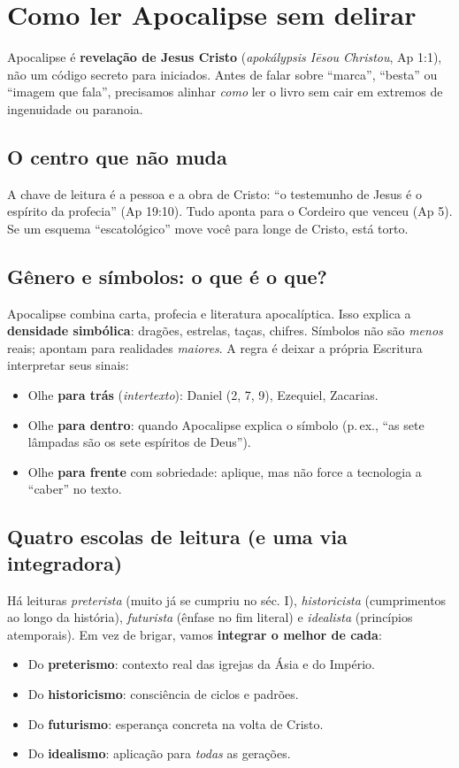 \chapter{Como ler Apocalipse sem delirar}
Apocalipse é \textbf{revelação de Jesus Cristo} (\emph{apokálypsis Iēsou Christou}, Ap 1:1), não um código secreto para iniciados. Antes de falar sobre “marca”, “besta” ou “imagem que fala”, precisamos alinhar \textit{como} ler o livro sem cair em extremos de ingenuidade ou paranoia.

\section{O centro que não muda}
A chave de leitura é a pessoa e a obra de Cristo: “o testemunho de Jesus é o espírito da profecia” (Ap 19:10). Tudo aponta para o Cordeiro que venceu (Ap 5). Se um esquema “escatológico” move você para longe de Cristo, está torto.

\section{Gênero e símbolos: o que é o que?}
Apocalipse combina carta, profecia e literatura apocalíptica. Isso explica a \textbf{densidade simbólica}: dragões, estrelas, taças, chifres. Símbolos não são \emph{menos} reais; apontam para realidades \emph{maiores}. A regra é deixar a própria Escritura interpretar seus sinais:
\begin{itemize}[leftmargin=*,noitemsep]
  \item Olhe \textbf{para trás} (\textit{intertexto}): Daniel (2, 7, 9), Ezequiel, Zacarias.
  \item Olhe \textbf{para dentro}: quando Apocalipse explica o símbolo (p.\,ex., “as sete lâmpadas são os sete espíritos de Deus”). 
  \item Olhe \textbf{para frente} com sobriedade: aplique, mas não force a tecnologia a “caber” no texto.
\end{itemize}

\section{Quatro escolas de leitura (e uma via integradora)}
Há leituras \textit{preterista} (muito já se cumpriu no séc. I), \textit{historicista} (cumprimentos ao longo da história), \textit{futurista} (ênfase no fim literal) e \textit{idealista} (princípios atemporais). Em vez de brigar, vamos \textbf{integrar o melhor de cada}:
\begin{itemize}[leftmargin=*,noitemsep]
  \item Do \textbf{preterismo}: contexto real das igrejas da Ásia e do Império.
  \item Do \textbf{historicismo}: consciência de ciclos e padrões.
  \item Do \textbf{futurismo}: esperança concreta na volta de Cristo.
  \item Do \textbf{idealismo}: aplicação para \textit{todas} as gerações.
\end{itemize}

